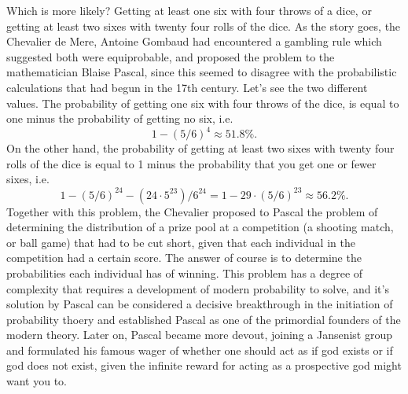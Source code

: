 \begin{example}
    Which is more likely? Getting at least one six with four throws of a dice, or getting at least two sixes with twenty four rolls of the dice. As the story goes, the Chevalier de Mere, Antoine Gombaud had encountered a gambling rule which suggested both were equiprobable, and proposed the problem to the mathematician Blaise Pascal, since this seemed to disagree with the probabilistic calculations that had begun in the 17th century. Let's see the two different values. The probability of getting one six with four throws of the dice, is equal to one minus the probability of getting no six, i.e.
    \[ 1 - (5/6)^4 \approx 51.8\%. \]
    On the other hand, the probability of getting at least two sixes with twenty four rolls of the dice is equal to 1 minus the probability that you get one or fewer sixes, i.e.
    \[ 1 - (5/6)^{24} - (24 \cdot 5^{23}) / 6^{24} = 1 - 29 \cdot (5/6)^{23} \approx 56.2\%. \]
    Together with this problem, the Chevalier proposed to Pascal the problem of determining the distribution of a prize pool at a competition (a shooting match, or ball game) that had to be cut short, given that each individual in the competition had a certain score. The answer of course is to determine the probabilities each individual has of winning. This problem has a degree of complexity that requires a development of modern probability to solve, and it's solution by Pascal can be considered a decisive breakthrough in the initiation of probability thoery and established Pascal as one of the primordial founders of the modern theory. Later on, Pascal became more devout, joining a Jansenist group and formulated his famous wager of whether one should act as if god exists or if god does not exist, given the infinite reward for acting as a prospective god might want you to.
\end{example}

